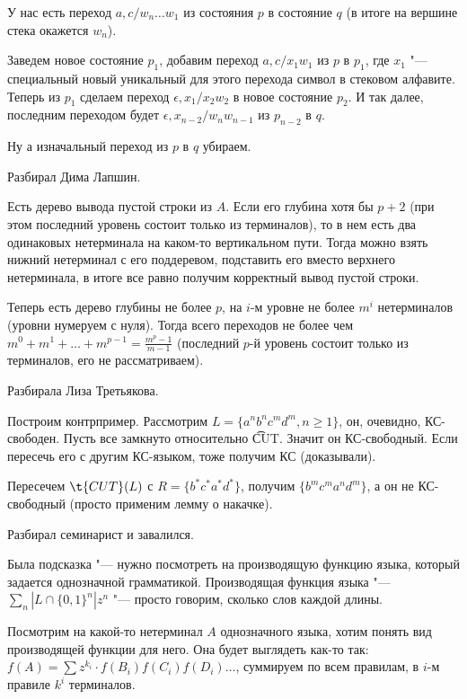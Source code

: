 У нас есть переход $a, c/w_n\dots w_1$ из состояния $p$ в состояние $q$  (в итоге на вершине стека окажется $w_n$).

Заведем новое состояние $p_1$, добавим переход $a, c/x_1w_1$ из $p$ в $p_1$, где $x_1$ "--- специальный новый уникальный для этого перехода символ в стековом алфавите.
Теперь из $p_1$ сделаем переход $\epsilon, x_1/x_2w_2$ в новое состояние $p_2$. И так далее, последним переходом будет $\epsilon, x_{n-2}/w_n w_{n-1}$ из $p_{n-2}$ в $q$.

Ну а изначальный переход из $p$ в $q$ убираем.

Разбирал Дима Лапшин.

Есть дерево вывода пустой строки из $A$. Если его глубина хотя бы $p + 2$ (при этом последний уровень состоит только из терминалов), то в нем есть два одинаковых нетерминала на каком-то вертикальном пути. 
Тогда можно взять нижний нетерминал с его поддеревом, подставить его вместо верхнего нетерминала, в итоге все равно получим корректный вывод пустой строки.

Теперь есть дерево глубины не более $p$, на $i$-м уровне не более $m^i$ нетерминалов (уровни нумеруем с нуля). 
Тогда всего переходов не более чем $m^0 + m^1 + \dots + m^{p-1} = \frac{m^p - 1}{m - 1}$ (последний $p$-й уровень состоит только из терминалов, его не рассматриваем).

Разбирала Лиза Третьякова.

Построим контрпример. Рассмотрим $L = \{a^n b^n c^m d^m, n \geq 1\}$, он, очевидно, КС-свободен. Пусть все замкнуто относительно \t{CUT}. 
Значит он КС-свободный. Если пересечь его с другим КС-языком, тоже получим КС (доказывали).

Пересечем $\t{CUT}(L)$ с $R = \{b^* c^* a^* d^*\}$, получим $\{b^m c^m a^n d^m\}$, а он не КС-свободный (просто применим лемму о накачке).

Разбирал семинарист и завалился.

Была подсказка "--- нужно посмотреть на производящую функцию языка, который задается однозначной грамматикой.
Производящая функция языка "--- $\sum \limits_n | L \cap \{0, 1\}^n | z^n$ "--- просто говорим, сколько слов каждой длины.

Посмотрим на какой-то нетерминал $A$ однозначного языка, хотим понять вид производящей функции для него.
Она будет выглядеть как-то так: $f(A) = \sum z^{k_i} \cdot f(B_i) f(C_i) f(D_i) \dots$, суммируем по всем правилам, в $i$-м правиле $k^i$ терминалов.

